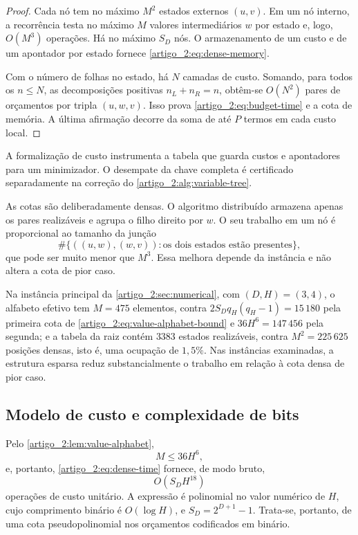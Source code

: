 \begin{proof}
Cada nó tem no máximo $M^2$ estados externos $(u,v)$. Em um nó interno, a
recorrência testa no máximo $M$ valores intermediários $w$ por estado e, logo,
$O(M^3)$ operações. Há no máximo $S_D$ nós. O armazenamento de um custo e de um apontador
por estado fornece \eqref{artigo_2:eq:dense-memory}.

Com o número de folhas no estado, há $N$ camadas de custo. Somando, para todos
os $n\le N$, as decomposições positivas $n_L+n_R=n$, obtêm-se $O(N^2)$ pares de
orçamentos por tripla $(u,w,v)$. Isso prova \eqref{artigo_2:eq:budget-time} e a cota de
memória. A última afirmação decorre da soma de até $P$ termos em cada custo local.
\end{proof}

A formalização de custo instrumenta a tabela que guarda custos e
apontadores para um minimizador. O desempate da chave completa é
certificado separadamente na correção do
\cref{artigo_2:alg:variable-tree}.

\begin{remark}\label{map:artigo_2:9.2}
\label{artigo_2:rem:sparse}
As cotas são deliberadamente densas. O algoritmo distribuído armazena apenas
os pares realizáveis e agrupa o filho direito por $w$. O seu trabalho em um nó é
proporcional ao tamanho da junção
\[
 \#\{((u,w),(w,v)):\text{os dois estados estão presentes}\},
\]
que pode ser muito menor que $M^3$. Essa melhora depende da instância e não
altera a cota de pior caso.

Na instância principal da \cref{artigo_2:sec:numerical}, com
$(D,H)=(3,4)$, o alfabeto efetivo tem $M=475$ elementos, contra
$2S_Dq_H(q_H-1)=15\,180$ pela primeira cota de
\eqref{artigo_2:eq:value-alphabet-bound} e $36H^6=147\,456$ pela segunda; e a tabela da
raiz contém $3383$ estados realizáveis, contra $M^2=225\,625$ posições
densas, isto é, uma ocupação de $1{,}5\%$. Nas instâncias examinadas, a
estrutura esparsa reduz substancialmente o trabalho em relação à cota densa de
pior caso.
\end{remark}

\subsection{Modelo de custo e complexidade de bits}

Pelo \cref{artigo_2:lem:value-alphabet},
\[
 M\le36H^6,
\]
e, portanto, \eqref{artigo_2:eq:dense-time} fornece, de modo bruto,
\begin{equation}
 O(S_DH^{18})
 \label{artigo_2:eq:height-worst}
\end{equation}
operações de custo unitário. A expressão é polinomial no valor numérico de
$H$, cujo comprimento binário é $O(\log H)$, e
$S_D=2^{D+1}-1$. Trata-se, portanto, de uma cota pseudopolinomial nos
orçamentos codificados em binário.

